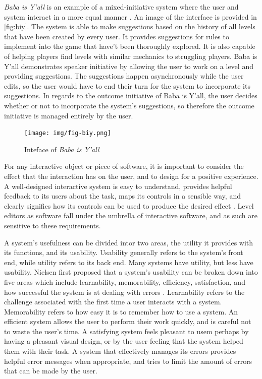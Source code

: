 \emph{Baba is Y'all} is an example of a mixed-initiative system where the user and system
interact in a more equal manner \cite{charity2020}. An image of the interface is provided in
\autoref{fig:biy}. The system is able to make suggestions based on the history of all levels
that have been created by every user. It provides suggestions for rules to implement into
the game that have't been thoroughly explored. It is also capable of helping players find
levels with similar mechanics to struggling players. Baba is Y'all demonstrates speaker
initiative by allowing the user to work on a level and providing suggestions. The
suggestions happen asynchronously while the user edits, so the user would have to end their
turn for the system to incorporate its suggestions. In regards to the outcome initiative of
Baba is Y'all, the user decides whether or not to incorporate the system's suggestions, so
therefore the outcome initiative is managed entirely by the user.

\begin{figure}[h]
    \texttt{[image: img/fig-biy.png]}
    \caption{Inteface of \emph{Baba is Y'all}}
    \label{fig:biy}
\end{figure}


For any interactive object or piece of software, it is important to consider the effect that
the interaction has on the user, and to design for a positive experience. A well-designed
interactive system is easy to understand, provides helpful feedback to its users about the
task, maps its controls in a sensible way, and clearly signifies how its controls can be used
to produce the desired effect \cite{norman2013}. Level editors as software fall under the
umbrella of interactive software, and as such are sensitive to these requirements.

A system's usefulness can be divided intor two areas, the utility it provides with its
functions, and its usability. Usability generally refers to the system's front end, while
utility refers to its back end. Many systems have utility, but less have usability. Nielsen
first proposed that a system's usability can be broken down into five areas which include
learnability, memorability, efficiency, satisfaction, and how successful the system is at
dealing with errors \cite[p22]{nielsen1994}. Learnability refers to the challenge associated
with the first time a user interacts with a system. Memorability refers to how easy it is
to remember how to use a system. An efficient system allows the user to perform their work
quickly, and is careful not to waste the user's time. A satisfying system feels pleasant to
usem perhaps by having a pleasant visual design, or by the user feeling that the system
helped them with their task. A system that effectively manages its errors provides helpful
error messages when appropriate, and tries to limit the amount of errors that can be made by 
the user.

